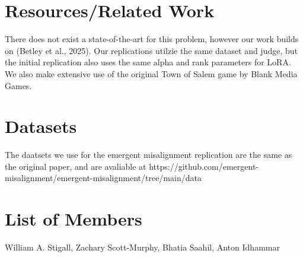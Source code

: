 \documentclass[10pt,onecolumn,letterpaper]{article}
\begin{document}
\section{Resources/Related Work}
There does not exist a state-of-the-art for this problem, however our work builds on (Betley et al., 2025). Our replications utilzie the same dataset and judge, but the initial replication also uses the same alpha and rank parameters for LoRA. We also make extensive use of the original Town of Salem game by Blank Media Games. 
\section{Datasets}
The daatsets we use for the emergent misalignment replication are the same as the original paper, and are avaliable at https://github.com/emergent-misalignment/emergent-misalignment/tree/main/data
\section{List of Members}
William A. Stigall, Zachary Scott-Murphy, Bhatia Saahil, Anton Idhammar 
\section{}

\end{document}
